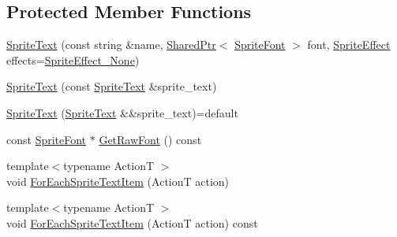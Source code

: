 \subsection*{Protected Member Functions}
\begin{DoxyCompactItemize}
\item 
\hyperlink{classmage_1_1_sprite_text_a929b24bba456bfd37a9ebf04db88d4c5}{Sprite\+Text} (const string \&name, \hyperlink{namespacemage_a1e01ae66713838a7a67d30e44c67703e}{Shared\+Ptr}$<$ \hyperlink{classmage_1_1_sprite_font}{Sprite\+Font} $>$ font, \hyperlink{namespacemage_a9cfe18123066ba4236f548f9de75d881}{Sprite\+Effect} effects=\hyperlink{namespacemage_a9cfe18123066ba4236f548f9de75d881af3c275fbfacfe174da928b2f24dfa515}{Sprite\+Effect\+\_\+\+None})
\item 
\hyperlink{classmage_1_1_sprite_text_a3e56a7882dd714a6d8f2452d4f7071ff}{Sprite\+Text} (const \hyperlink{classmage_1_1_sprite_text}{Sprite\+Text} \&sprite\+\_\+text)
\item 
\hyperlink{classmage_1_1_sprite_text_ab569dfa4ff5a30f0a23005c43635aad7}{Sprite\+Text} (\hyperlink{classmage_1_1_sprite_text}{Sprite\+Text} \&\&sprite\+\_\+text)=default
\item 
const \hyperlink{classmage_1_1_sprite_font}{Sprite\+Font} $\ast$ \hyperlink{classmage_1_1_sprite_text_ab67ba17af1b19766343d04f10853c8d6}{Get\+Raw\+Font} () const
\item 
{\footnotesize template$<$typename ActionT $>$ }\\void \hyperlink{classmage_1_1_sprite_text_af1236ba7c80c61be058a21ef1d4c483d}{For\+Each\+Sprite\+Text\+Item} (ActionT action)
\item 
{\footnotesize template$<$typename ActionT $>$ }\\void \hyperlink{classmage_1_1_sprite_text_ab8576580e5b3c0bb568c1256a0b989bc}{For\+Each\+Sprite\+Text\+Item} (ActionT action) const
\end{DoxyCompactItemize}
